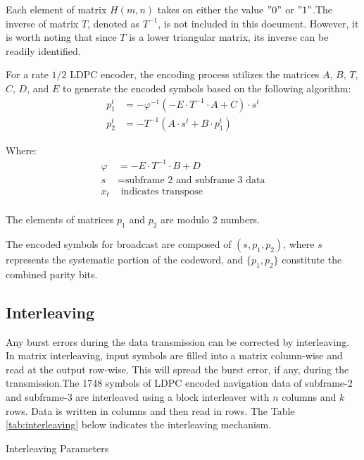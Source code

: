 \noindent Each element of matrix $H(m, n)$ takes on either the value $"0"$ or $"1"$.The inverse of matrix $T$, denoted as $T^{-1}$, is not included in this document. However, it is worth noting that since $T$ is a lower triangular matrix, its inverse can be readily identified.

For a rate $1/2$ LDPC encoder, the encoding process utilizes the matrices $A$, $B$, $T$, $C$, $D$, and $E$ to generate the encoded symbols based on the following algorithm:
\begin{align}
p_1^t &= -\varphi^{-1} (-E \cdot T^{-1} \cdot A + C) \cdot s^t \\
p_2^t &= -T^{-1} (A \cdot s^t + B \cdot p_1^t)
\end{align}


\noindent Where:
\begin{align*}
\varphi &= -E \cdot T^{-1} \cdot B + D \\
s &= \text{subframe 2 and subframe 3 data} \\
x_t &\text{ indicates transpose} \\
\end{align*}

\noindent The elements of matrices $p_1$ and $p_2$ are modulo 2 numbers.

\noindent The encoded symbols for broadcast are composed of $(s, p_1, p_2)$, where $s$ represents the systematic portion of the codeword, and $\{p_1, p_2\}$ constitute the combined parity bits.


\subsection{Interleaving}
\noindent Any burst errors during the data transmission can be corrected by interleaving. In matrix interleaving, input symbols are filled into a matrix column-wise and read at the output row-wise. This will spread the burst error, if any, during the transmission.The 1748 symbols of LDPC encoded navigation data of subframe-2 and subframe-3 are interleaved using a block interleaver with $n$ columns and $k$ rows. Data is written in columns and then read in rows. The Table \ref{tab:interleaving} below indicates the interleaving mechanism.

\begin{table}[ht]
\centering

\caption{Interleaving Parameters}
\label{tab:interleaving}
\end{table}



